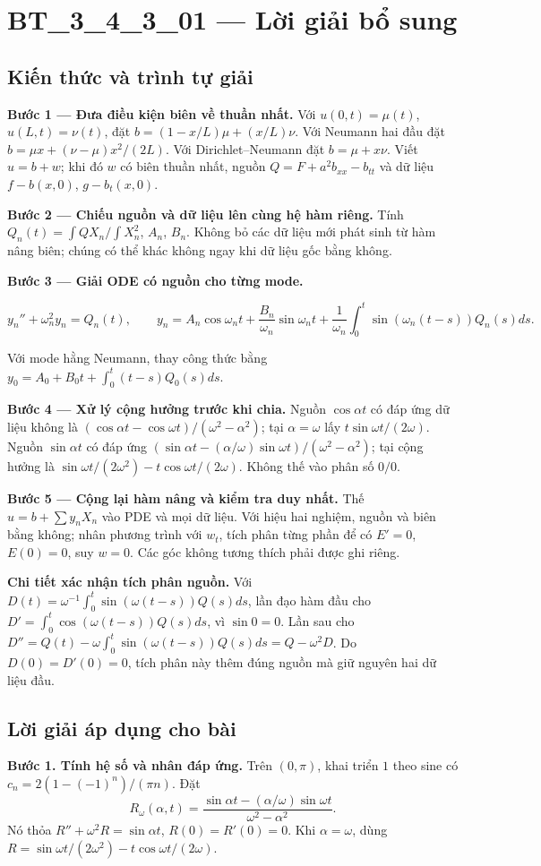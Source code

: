 \documentclass[10pt,a4paper]{article}
\begin{document}
\section*{BT\_3\_4\_3\_01 — Lời giải bổ sung}
\subsection*{Kiến thức và trình tự giải}
\textbf{Bước 1 — Đưa điều kiện biên về thuần nhất.} Với $u(0,t)=\mu(t)$, $u(L,t)=\nu(t)$, đặt $b=(1-x/L)\mu+(x/L)\nu$. Với Neumann hai đầu đặt $b=\mu x+(\nu-\mu)x^2/(2L)$. Với Dirichlet–Neumann đặt $b=\mu+x\nu$. Viết $u=b+w$; khi đó $w$ có biên thuần nhất, nguồn $Q=F+a^2b_{xx}-b_{tt}$ và dữ liệu $f-b(x,0)$, $g-b_t(x,0)$.

\textbf{Bước 2 — Chiếu nguồn và dữ liệu lên cùng hệ hàm riêng.} Tính $Q_n(t)=\int QX_n/\int X_n^2$, $A_n$, $B_n$. Không bỏ các dữ liệu mới phát sinh từ hàm nâng biên; chúng có thể khác không ngay khi dữ liệu gốc bằng không.

\textbf{Bước 3 — Giải ODE có nguồn cho từng mode.}


\[
y_n''+\omega_n^2y_n=Q_n(t),\qquad
y_n=A_n\cos\omega_nt+\frac{B_n}{\omega_n}\sin\omega_nt+\frac1{\omega_n}\int_0^t\sin(\omega_n(t-s))Q_n(s)ds.
\]


Với mode hằng Neumann, thay công thức bằng $y_0=A_0+B_0t+\int_0^t(t-s)Q_0(s)ds$.

\textbf{Bước 4 — Xử lý cộng hưởng trước khi chia.} Nguồn $\cos\alpha t$ có đáp ứng dữ liệu không là $(\cos\alpha t-\cos\omega t)/(\omega^2-\alpha^2)$; tại $\alpha=\omega$ lấy $t\sin\omega t/(2\omega)$. Nguồn $\sin\alpha t$ có đáp ứng $(\sin\alpha t-(\alpha/\omega)\sin\omega t)/(\omega^2-\alpha^2)$; tại cộng hưởng là $\sin\omega t/(2\omega^2)-t\cos\omega t/(2\omega)$. Không thế vào phân số $0/0$.

\textbf{Bước 5 — Cộng lại hàm nâng và kiểm tra duy nhất.} Thế $u=b+\sum y_nX_n$ vào PDE và mọi dữ liệu. Với hiệu hai nghiệm, nguồn và biên bằng không; nhân phương trình với $w_t$, tích phân từng phần để có $E'=0$, $E(0)=0$, suy $w=0$. Các góc không tương thích phải được ghi riêng.

\textbf{Chi tiết xác nhận tích phân nguồn.} Với $D(t)=\omega^{-1}\int_0^t\sin(\omega(t-s))Q(s)ds$, lần đạo hàm đầu cho $D'=\int_0^t\cos(\omega(t-s))Q(s)ds$, vì $\sin0=0$. Lần sau cho $D''=Q(t)-\omega\int_0^t\sin(\omega(t-s))Q(s)ds=Q-\omega^2D$. Do $D(0)=D'(0)=0$, tích phân này thêm đúng nguồn mà giữ nguyên hai dữ liệu đầu.
\subsection*{Lời giải áp dụng cho bài}
\textbf{Bước 1. Tính hệ số và nhân đáp ứng.} Trên $(0,\pi)$, khai triển $1$ theo sine có $c_n=2(1-(-1)^n)/(\pi n)$. Đặt
\[R_\omega(\alpha,t)=\frac{\sin\alpha t-(\alpha/\omega)\sin\omega t}{\omega^2-\alpha^2}.\]
Nó thỏa $R''+\omega^2R=\sin\alpha t$, $R(0)=R'(0)=0$. Khi $\alpha=\omega$, dùng $R=\sin\omega t/(2\omega^2)-t\cos\omega t/(2\omega)$.
\end{document}
